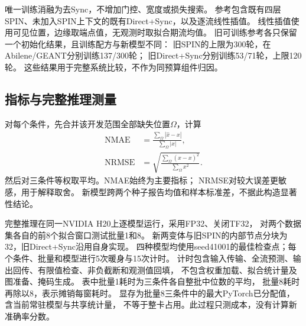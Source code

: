 唯一训练消融为去Sync，不增加门控、宽度或损失搜索。
参考包含既有四层SPIN、未加入SPIN上下文的既有Direct+Sync，以及逐流线性插值。
线性插值使用可见位置，边缘取端点值，无观测时取拟合期流均值。
旧可训练参考各只保留一个初始化结果，且训练配方与新模型不同：
旧SPIN的上限为300轮，在Abilene/GEANT分别训练137/300轮；
旧Direct+Sync分别训练53/71轮，上限120轮。
这些结果用于完整系统比较，不作为同预算组件归因。

\subsection{指标与完整推理测量}
对每个条件，先合并该开发范围全部缺失位置$\Omega$，计算
\begin{equation}
\begin{aligned}
\mathrm{NMAE}&=\frac{\sum_{\Omega}|\widehat{x}-x|}{\sum_{\Omega}|x|},\\
\mathrm{NRMSE}&=\sqrt{\frac{\sum_{\Omega}(\widehat{x}-x)^2}{\sum_{\Omega}x^2}}.
\end{aligned}
\label{eq:metrics}
\end{equation}
然后对三条件等权取平均。NMAE始终为主要指标；
NRMSE对较大误差更敏感，用于解释取舍。
新模型跨两个种子报告均值和样本标准差，不据此构造显著性结论。

完整推理在同一NVIDIA H20上逐模型运行，采用FP32、关闭TF32，
对两个数据集各自的前8个拟合窗口测试批量1和8。
新两变体与旧SPIN的内部节点分块为32，旧Direct+Sync沿用自身实现。
四种模型均使用seed41001的最佳检查点；每个条件、批量和模型进行5次暖身与15次计时。
计时包含输入传输、全流预测、输出回传、有限值检查、非负截断和观测值回填，
不包含权重加载、拟合统计量及图准备、掩码生成。
表中批量1耗时为三条件各自整批中位数的平均，
批量8耗时再除以8，表示摊销每窗耗时。
显存为批量8三条件中的最大PyTorch已分配值，含当前常驻模型与共享统计量，
不等于整卡占用。此过程只测成本，没有计算新准确率分数。
